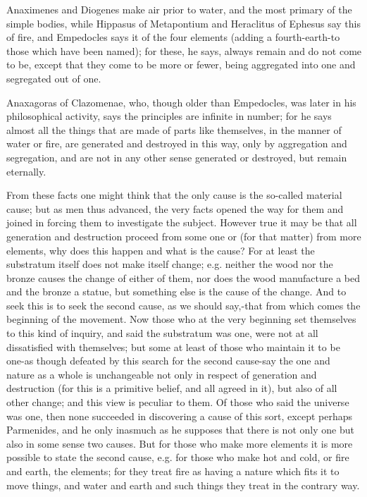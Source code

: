 \documentclass[oneside, 17pt, dvipsnames]{extbook}
\begin{document}
Anaximenes and Diogenes make air prior to water, and the most primary of the simple bodies, while Hippasus of Metapontium and Heraclitus of Ephesus say this of fire, and Empedocles says it of the four elements (adding a fourth-earth-to those which have been named); for these, he says, always remain and do not come to be, except that they come to be more or fewer, being aggregated into one and segregated out of one.

Anaxagoras of Clazomenae, who, though older than Empedocles, was later in his philosophical activity, says the principles are infinite in number; for he says almost all the things that are made of parts like themselves, in the manner of water or fire, are generated and destroyed in this way, only by aggregation and segregation, and are not in any other sense generated or destroyed, but remain eternally.

From these facts one might think that the only cause is the so-called material cause; but as men thus advanced, the very facts opened the way for them and joined in forcing them to investigate the subject. However true it may be that all generation and destruction proceed from some one or (for that matter) from more elements, why does this happen and what is the cause? For at least the substratum itself does not make itself change; e.g. neither the wood nor the bronze causes the change of either of them, nor does the wood manufacture a bed and the bronze a statue, but something else is the cause of the change. And to seek this is to seek the second cause, as we should say,-that from which comes the beginning of the movement. Now those who at the very beginning set themselves to this kind of inquiry, and said the substratum was one, were not at all dissatisfied with themselves; but some at least of those who maintain it to be one-as though defeated by this search for the second cause-say the one and nature as a whole is unchangeable not only in respect of generation and destruction (for this is a primitive belief, and all agreed in it), but also of all other change; and this view is peculiar to them. Of those who said the universe was one, then none succeeded in discovering a cause of this sort, except perhaps Parmenides, and he only inasmuch as he supposes that there is not only one but also in some sense two causes. But for those who make more elements it is more possible to state the second cause, e.g. for those who make hot and cold, or fire and earth, the elements; for they treat fire as having a nature which fits it to move things, and water and earth and such things they treat in the contrary way.
\end{document}
